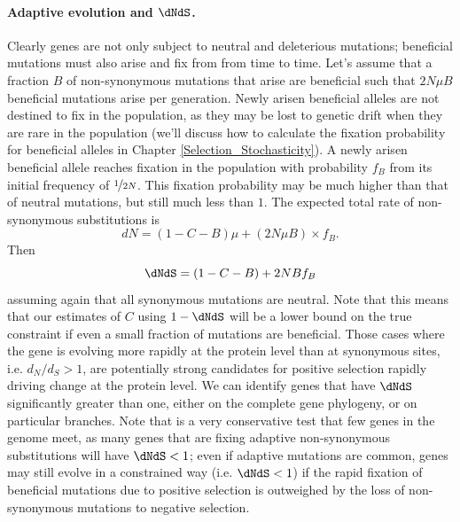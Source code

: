 \paragraph{Adaptive evolution and $\dNdS$.}
Clearly genes are not only subject to neutral and deleterious mutations; beneficial mutations must also arise and fix from from time to time.
Let's assume that a fraction $B$ of non-synonymous mutations that arise are
beneficial such that $2 N \mu B$ beneficial mutations arise per generation. Newly arisen beneficial alleles are not destined to fix in the population, as they may be lost to genetic drift when they are rare in the population (we'll
discuss how to calculate the fixation probability for beneficial
alleles in Chapter \ref{Selection_Stochasticity}). A newly arisen beneficial allele reaches fixation in the population with probability $f_B$ from its initial frequency of $\nicefrac{1}{2N}$. This fixation
probability may be much higher than that of neutral mutations, but
still much less than $1$. The expected total rate of non-synonymous
substitutions is
\begin{equation}
dN= (1-C - B) \mu  +   (2 N \mu B) \times  f_B.
\end{equation}
Then
\begin{equation}
\dNdS = (1-C-B) +  2 N B f_B \label{eqn:dNDS_C_B}
\end{equation}
assuming again that all synonymous mutations are neutral. Note that this means that our estimates of $C$ using $1-\dNdS$ will be
a  lower bound on the true constraint if even a small fraction of
mutations are beneficial. Those cases where the gene is evolving more rapidly at the protein level than at synonymous
sites, i.e. $d_N/d_S > 1$, are potentially strong candidates for  positive selection rapidly driving change at the protein level. We can identify genes that have $\dNdS$ significantly greater than one, either on the complete gene phylogeny, or on particular branches. Note that is a very conservative test that few genes in the genome meet, as many genes that are fixing adaptive non-synonymous substitutions will have $\dNdS<1$;  even if adaptive mutations are common, genes may still evolve in a constrained way (i.e. $\dNdS<1$) if
the rapid fixation of beneficial mutations due to positive selection is outweighed by the loss of non-synonymous mutations to negative selection.


